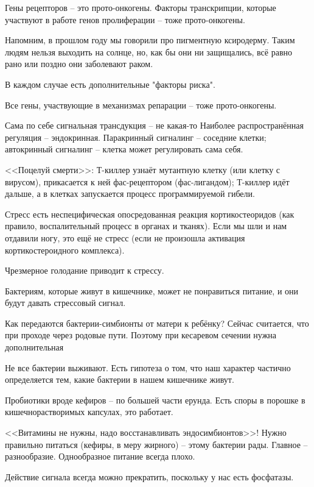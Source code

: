 \documentclass[main.tex]{subfiles}
\begin{document}
Гены рецепторов -- это прото-онкогены.
Факторы транскрипции, которые участвуют в работе генов пролиферации -- тоже прото-онкогены.

Напомним, в прошлом году мы говорили про пигментную ксиродерму.
Таким людям нельзя выходить на солнце, но, как бы они ни защищались, всё равно рано или поздно они заболевают раком.

В каждом случае есть дополнительные "факторы риска".

Все гены, участвующие в механизмах репарации -- тоже прото-онкогены.


Сама по себе сигнальная трансдукция -- не какая-то
Наиболее распространённая регуляция -- эндокринная.
Паракринный сигналинг -- соседние клетки; автокринный сигналинг -- клетка может регулировать сама себя.

<<Поцелуй смерти>>: Т-киллер узнаёт мутантную клетку (или клетку с вирусом), прикасается к ней фас-рецептором (фас-лигандом); Т-киллер идёт дальше, а в клетках запускается процесс программируемой гибели.

\begin{leftbar}
Стресс есть неспецифическая опосредованная реакция кортикостеоридов (как правило, воспалительный процесс в органах и тканях).
Если мы шли и нам отдавили ногу, это ещё не стресс (если не произошла активация кортикостероидного комплекса).

Чрезмерное голодание приводит к стрессу.

Бактериям, которые живут в кишечнике, может не понравиться питание, и они будут давать стрессовый сигнал.

Как передаются бактерии-симбионты от матери к ребёнку?
Сейчас считается, что при проходе через родовые пути.
Поэтому при кесаревом сечении нужна дополнительная 

Не все бактерии выживают.
Есть гипотеза о том, что наш характер частично определяется тем, какие бактерии в нашем кишечнике живут.

Пробиотики вроде кефиров -- по большей части ерунда.
Есть споры в порошке в кишечнорастворимых капсулах, это работает.

<<Витамины не нужны, надо восстанавливать эндосимбионтов>>!
Нужно правильно питаться (кефиры, в меру жирного) -- этому бактерии рады.
Главное -- разнообразие.
Однообразное питание всегда плохо.

\end{leftbar}

Действие сигнала всегда можно прекратить, поскольку у нас есть фосфатазы.
\end{document}
